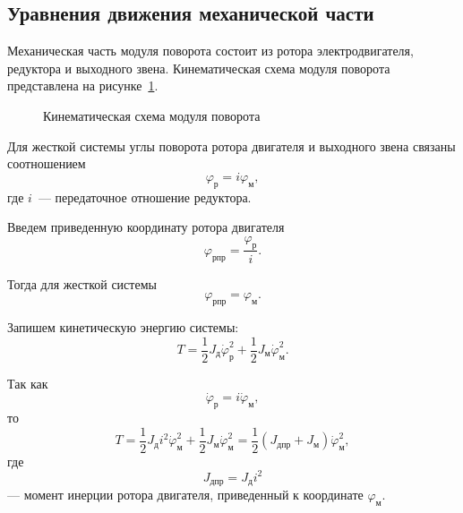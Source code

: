 \subsection{Уравнения движения механической части}

Механическая часть модуля поворота состоит из ротора электродвигателя, редуктора и выходного звена. Кинематическая схема модуля поворота представлена на рисунке~\ref{fig:kinematic_scheme}.

\begin{figure}[H]
    \centering
    
    \caption{Кинематическая схема модуля поворота}
    \label{fig:kinematic_scheme}
\end{figure}

Для жесткой системы углы поворота ротора двигателя и выходного звена связаны соотношением
\begin{equation}
    \varphi_{\text{р}} = i \varphi_{\text{м}},
\end{equation}
где $i$~--- передаточное отношение редуктора.

Введем приведенную координату ротора двигателя
\begin{equation}
    \varphi_{\text{рпр}} = \frac{\varphi_{\text{р}}}{i}.
\end{equation}

Тогда для жесткой системы
\begin{equation}
    \varphi_{\text{рпр}} = \varphi_{\text{м}}.
\end{equation}

Запишем кинетическую энергию системы:
\begin{equation}
    T =
    \frac{1}{2} J_{\text{д}} \dot{\varphi}_{\text{р}}^2
    +
    \frac{1}{2} J_{\text{м}} \dot{\varphi}_{\text{м}}^2.
\end{equation}

Так как
\begin{equation}
    \dot{\varphi}_{\text{р}} = i \dot{\varphi}_{\text{м}},
\end{equation}
то
\begin{equation}
    T =
    \frac{1}{2} J_{\text{д}} i^2 \dot{\varphi}_{\text{м}}^2
    +
    \frac{1}{2} J_{\text{м}} \dot{\varphi}_{\text{м}}^2
    =
    \frac{1}{2}
    \left(
        J_{\text{дпр}} + J_{\text{м}}
    \right)
    \dot{\varphi}_{\text{м}}^2,
\end{equation}
где
\begin{equation}
    J_{\text{дпр}} = J_{\text{д}} i^2
\end{equation}
--- момент инерции ротора двигателя, приведенный к координате $\varphi_{\text{м}}$.

